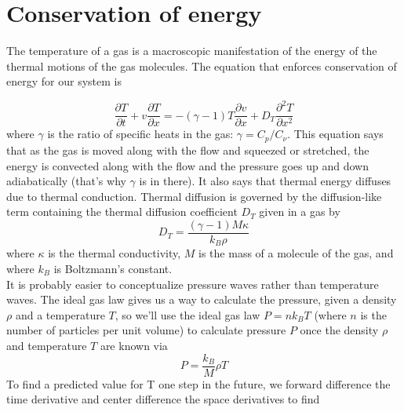 \section*{Conservation of energy}

The temperature of a gas is a macroscopic manifestation of the energy of the
thermal motions of the gas molecules. The equation that enforces conservation
of energy for our system is

\begin{equation}\label{eq:1112}
\frac{\partial T}{\partial t}+v \frac{\partial T}{\partial x}=-(\gamma-1) T \frac{\partial v}{\partial x}+D_{T} \frac{\partial^{2} T}{\partial x^{2}}
\end{equation}
where $\gamma$ is the ratio of specific heats in the gas: $\gamma=C_{p} / C_{\nu}$. This equation says that as the gas is moved along with the flow and squeezed or stretched, the energy is convected along with the flow and the pressure goes up and down adiabatically (that\rq s why $\gamma$ is in there). It also says that thermal energy diffuses due to thermal conduction. Thermal diffusion is governed by the diffusion-like term containing the thermal diffusion coefficient $D_{T}$ given in a gas by
\begin{equation}\label{eq:1113}
D_{T}=\frac{(\gamma-1) M \kappa}{k_{B} \rho}
\end{equation}
where $\kappa$ is the thermal conductivity, $M$ is the mass of a molecule of the gas, and where $k_{B}$ is Boltzmann\rq s constant.\\
It is probably easier to conceptualize pressure waves rather than temperature waves. The ideal gas law gives us a way to calculate the pressure, given a density $\rho$ and a temperature $T$, so we\rq ll use the ideal gas law $P=n k_{B} T$ (where $n$ is the number of particles per unit volume) to calculate pressure $P$ once the density $\rho$ and temperature $T$ are known via
\begin{equation}\label{eq:1114}
P=\frac{k_{B}}{M} \rho T
\end{equation}
To find a predicted value for T one step in the future, we forward difference
the time derivative and center difference the space derivatives to find

